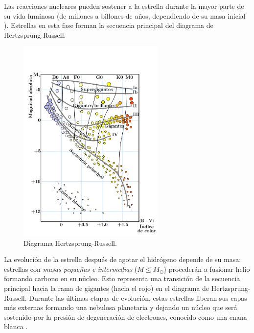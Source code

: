 Las reacciones nucleares pueden sostener a la estrella durante la mayor parte de su vida luminosa (de millones a billones de años, dependiendo de su masa inicial \cite{Salaris2005}). Estrellas en esta fase forman la secuencia principal del diagrama de Hertzsprung-Russell.
\setcounter{footnote}{0}
\begin{figure}[H]
    \centering
    \includegraphics[width=205pt]{figures/H-R_diagram.pdf}%
    \caption[Diagrama Hertzsprung-Russell]{Diagrama Hertzsprung-Russell.\protect\footnotemark}
    \label{HR}
\end{figure}

La evolución de la estrella después de agotar el hidrógeno depende de su masa: estrellas con \emph{masas pequeñas e intermedias} ($M\leq M_{\odot}$) procederán a fusionar helio formando carbono en su núcleo. Esto representa una transición de la secuencia principal hacia la rama de gigantes (hacia el rojo) en el diagrama de Hertzsprung-Russell. Durante las últimas etapas de evolución, estas estrellas liberan sus capas más externas formando una nebulosa planetaria y dejando un núcleo que será sostenido por la presión de degeneración de electrones, conocido como una enana blanca \cite{Padmanabhan2000}.

